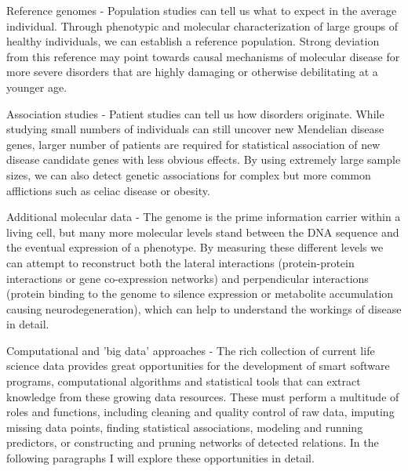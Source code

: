 Reference genomes - Population studies can tell us what to expect in the average individual.
Through phenotypic and molecular characterization of large groups of healthy individuals, we can establish a reference population.
Strong deviation from this reference may point towards causal mechanisms of molecular disease for more severe disorders that are highly damaging or otherwise debilitating at a younger age.

Association studies - Patient studies can tell us how disorders originate.
While studying small numbers of individuals can still uncover new Mendelian disease genes\cite{Witteveen_2016}, larger number of patients are required for statistical association of new disease candidate genes with less obvious effects\cite{Lelieveld_2016}.
By using extremely large sample sizes, we can also detect genetic associations for complex but more common afflictions such as celiac disease or obesity.

Additional molecular data - The genome is the prime information carrier within a living cell, but many more molecular levels stand between the DNA sequence and the eventual expression of a phenotype.
By measuring these different levels we can attempt to reconstruct both the lateral interactions (protein-protein interactions or gene co-expression networks) and perpendicular interactions (protein binding to the genome to silence expression or metabolite accumulation causing neurodegeneration), which can help to understand the workings of disease in detail.

Computational and 'big data' approaches - The rich collection of current life science data provides great opportunities for the development of smart software programs, computational algorithms and statistical tools that can extract knowledge from these growing data resources.
These must perform a multitude of roles and functions, including cleaning and quality control of raw data, imputing missing data points, finding statistical associations, modeling and running predictors, or constructing and pruning networks of detected relations.
In the following paragraphs I will explore these opportunities in detail.

